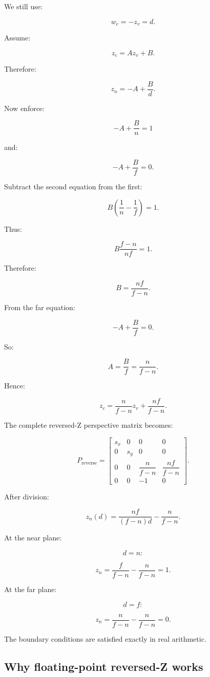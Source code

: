 \hypertarget{02-foundations-ii-ch033-deriving-reversed-z}{}

We still use:

\[
 w_c=-z_v=d.
\]

Assume:

\[
 z_c=Az_v+B.
\]

Therefore:

\[
 z_n=-A+\frac Bd.
\]

Now enforce:

\[
 -A+\frac Bn=1
\]

and:

\[
 -A+\frac Bf=0.
\]

Subtract the second equation from the first:

\[
 B\left(\frac1n-\frac1f\right)=1.
\]

Thus:

\[
 B\frac{f-n}{nf}=1.
\]

Therefore:

\[
 \boxed{ B=\frac{nf}{f-n} }.
\]

From the far equation:

\[
 -A+\frac Bf=0.
\]

So:

\[
 A=\frac Bf=\frac n{f-n}.
\]

Hence:

\[
 \boxed{ z_c= \frac n{f-n}z_v+ \frac{nf}{f-n} }.
\]

The complete reversed-Z perspective matrix becomes:

\[
 \boxed{ P_{\mathrm{reverse}}= \begin{bmatrix} s_x&0&0&0\\ 0&s_y&0&0\\ 0&0&\dfrac n{f-n}&\dfrac{nf}{f-n}\\ 0&0&-1&0 \end{bmatrix} }.
\]

After division:

\[
 \boxed{ z_n(d)= \frac{nf}{(f-n)d} -\frac n{f-n} }.
\]

At the near plane:

\[
 d=n:
\]

\[
 z_n= \frac f{f-n}-\frac n{f-n}=1.
\]

At the far plane:

\[
 d=f:
\]

\[
 z_n= \frac n{f-n}-\frac n{f-n}=0.
\]

The boundary conditions are satisfied exactly in real arithmetic.

\subsection{Why floating-point reversed-Z works}\label{02-foundations-ii-ch033-why-floating-point-reversed-z-works}

